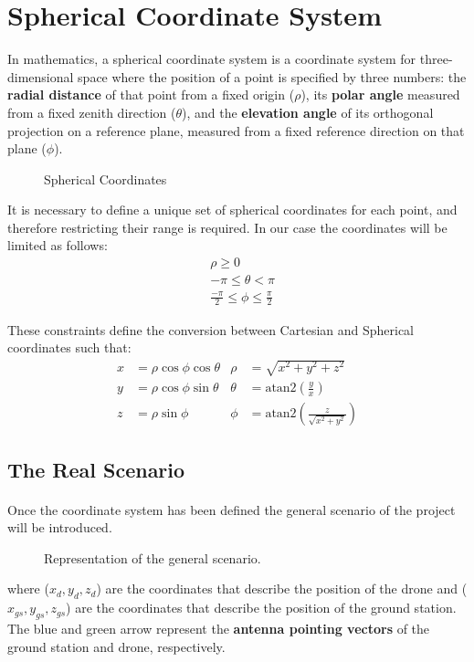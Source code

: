 \section{Spherical Coordinate System}

In mathematics, a spherical coordinate system is a coordinate system for three-dimensional space where the position of a point is specified by three numbers: the \textbf{radial distance} of that point from a fixed origin ($\rho$), its \textbf{polar angle} measured from a fixed zenith direction ($\theta$), and the \textbf{elevation angle} of its orthogonal projection on a reference plane, measured from a fixed reference direction on that plane ($\phi$).

\begin{figure}[H]
   \centering
     
    \label{fig:Spherical1}
    \caption{Spherical Coordinates}
\end{figure}

 It is necessary to define a unique set of spherical coordinates for each point, and therefore restricting their range is required. In our case the coordinates will be limited as follows:
\begin{align*}
& \rho \geq 0 \\
& -\pi \leq \theta < \pi \\
& \frac{-\pi}{2} \leq \phi \leq \frac{\pi}{2}
\label{eq:los_distToHorizon}
\end{align*} 

These constraints define the conversion between Cartesian and Spherical coordinates such that:
\begin{align*}
x &=  \rho\cos\phi\cos\theta	&	\rho &= \sqrt{x^{2} + y^{2} + z^{2}} \\
y &= \rho\cos\phi\sin\theta		&	\theta &= \text{atan2}\left(\frac{y}{x}\right)\\
z &= \rho\sin\phi				&	\phi &=  \text{atan2}\left(\frac{z}{\sqrt{x^2 + y^2}}\right)
\label{eq:los_distToHorizon}
\end{align*} 

\subsection{The Real Scenario}
\paragraph{} Once the coordinate system has been defined the general scenario of the project will be introduced.
\begin{figure}[H]
   \centering
     
    \label{fig:Scenario1}
    \caption{Representation of the general scenario.}
\end{figure}
where ($x_d,y_d,z_d$) are the coordinates that describe the position of the drone and ($x_{gs},y_{gs},z_{gs}$) are the coordinates that describe the position of the ground station.
The blue and green arrow represent the \textbf{antenna pointing vectors} of the ground station and drone, respectively.

